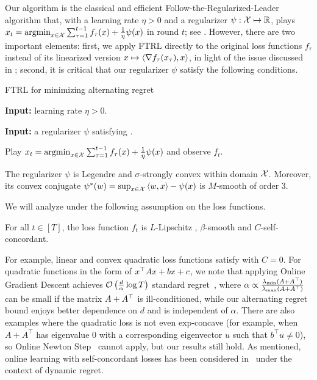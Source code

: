 Our algorithm is the classical and efficient Follow-the-Regularized-Leader algorithm that, with a learning rate $\eta>0$ and a regularizer $\psi: {\mathcal{X}} \mapsto \mathbb{R}$,
plays 
$
x_{t}=\operatorname*{argmin}_{x\in \mathcal{X}}\sum_{\tau=1}^{t-1} f_{\tau}(x)+\frac{1}{\eta}\psi(x)
$
in round $t$;
see .
However, there are two important elements:
first, we apply FTRL directly to the original loss functions $f_\tau$ instead of its linearized version $x\mapsto \left\langle {\nabla f_\tau(x_\tau), x} \right\rangle$, in light of the issue discussed in ;
second, it is critical that our regularizer $\psi$ satisfy the following conditions.

\begin{algorithm}[tb]
   \caption{FTRL for minimizing alternating regret}
   \label{alg:OCO}

   {\bfseries Input:} learning rate $\eta>0$.
   
   {\bfseries Input:} a regularizer $\psi$ satisfying .
   
    {
   
   Play
   $
   x_{t}=\operatorname*{argmin}_{x\in \mathcal{X}}\sum_{\tau=1}^{t-1} f_{\tau}(x)+\frac{1}{\eta}\psi(x)
   $
   and observe $f_t$.
   }

\end{algorithm}

\begin{assumption}\label{asp: psi}
    The regularizer $\psi$ is Legendre and $\sigma$-strongly convex  within domain ${\mathcal{X}}$.
    Moreover, its convex conjugate $\psi^*(w) = \sup_{x\in{\mathcal{X}}}\left\langle {w,x} \right\rangle-\psi(x)$ is $M$-smooth of order $3$. 
\end{assumption}

We will analyze  under the following assumption on the loss functions.
\begin{assumption}\label{asp: function}
    For all $t\in[T]$, the loss function $f_t$ is $L$-Lipschitz , $\beta$-smooth and $C$-self-concordant.
\end{assumption}

For example, linear and convex quadratic loss functions satisfy  with $C=0$. 
For quadratic functions in the form of $x^\top Ax+bx+c$, 
we note that applying Online Gradient Descent 
achieves $\mathcal{O}\left(\frac{d}{\alpha}\log T\right)$ standard regret~\citep{hazan2007logarithmic}, where $\alpha\propto\frac{\lambda_{\min}(A+A^\top)}{\lambda_{\max}(A+A^\top)}$ can be small if the matrix $A+A^\top$ is ill-conditioned,
while our alternating regret bound enjoys better dependence on $d$ and is independent of $\alpha$.
There are also examples where the quadratic loss is not even exp-concave 
(for example, when $A+A^\top$ has eigenvalue $0$ with a corresponding eigenvector $u$ such that  $b^\top u \neq 0$),
so Online Newton Step~\citep{hazan2007logarithmic} cannot apply, 
but our results still hold.
As mentioned, online learning with self-concordant losses has been considered in~\citet{zhang2017improved} under the context of dynamic regret.

